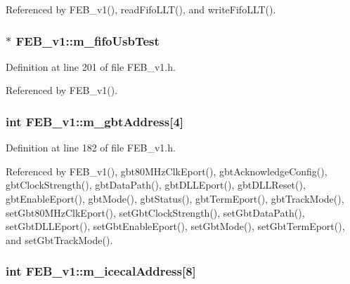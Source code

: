 Referenced by FEB\_\-v1(), readFifoLLT(), and writeFifoLLT().\hypertarget{classFEB__v1_a5850ce498462009212ad3f313fcf0bd6}{
\subsubsection[{m\_\-fifoUsbTest}]{$\ast$ {\bf FEB\_\-v1::m\_\-fifoUsbTest}}}
\label{classFEB__v1_a5850ce498462009212ad3f313fcf0bd6}


Definition at line 201 of file FEB\_\-v1.h.

Referenced by FEB\_\-v1().\hypertarget{classFEB__v1_ac625855df976f16694178f1a4c0eef1e}{
\subsubsection[{m\_\-gbtAddress}]{\setlength{\rightskip}{0pt plus 5cm}int {\bf FEB\_\-v1::m\_\-gbtAddress}\mbox{[}4\mbox{]}}}
\label{classFEB__v1_ac625855df976f16694178f1a4c0eef1e}


Definition at line 182 of file FEB\_\-v1.h.

Referenced by FEB\_\-v1(), gbt80MHzClkEport(), gbtAcknowledgeConfig(), gbtClockStrength(), gbtDataPath(), gbtDLLEport(), gbtDLLReset(), gbtEnableEport(), gbtMode(), gbtStatus(), gbtTermEport(), gbtTrackMode(), setGbt80MHzClkEport(), setGbtClockStrength(), setGbtDataPath(), setGbtDLLEport(), setGbtEnableEport(), setGbtMode(), setGbtTermEport(), and setGbtTrackMode().\hypertarget{classFEB__v1_adf21041831669e75283dd2a88fbaddf5}{
\subsubsection[{m\_\-icecalAddress}]{\setlength{\rightskip}{0pt plus 5cm}int {\bf FEB\_\-v1::m\_\-icecalAddress}\mbox{[}8\mbox{]}}}
\label{classFEB__v1_adf21041831669e75283dd2a88fbaddf5}


